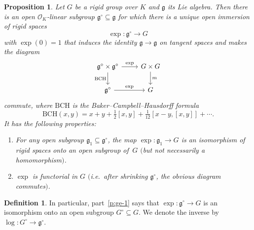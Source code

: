 \documentclass[11pt]{amsart}
\numberwithin{equation}{section}
\newtheorem{Proposition}[thm]{Proposition}
\theoremstyle{definition}
\newtheorem{Definition}[thm]{Definition}
\theoremstyle{remark}
\newcommand{\lra}{\longrightarrow}
\renewcommand{\O}{\mathcal{O}}
\newcommand{\mg}{\mathfrak{g}}
\begin{document}
\begin{Proposition}\label{p:general-exponential}
	Let $G$ be a rigid group over $K$ and $\mathfrak g$ its Lie algebra. Then there is an open $\O_K$-linear subgroup $\mathfrak g^{\circ}\subseteq \mathfrak g$ for which there is a unique open immersion of rigid spaces
	\[ \exp\colon\mathfrak g^{\circ}\lra G\]
	with $\exp(0)=1$ that induces the identity $\mathfrak g\to \mathfrak g$ on tangent spaces and makes the diagram
	\[\begin{tikzcd}
		\mathfrak g^{\circ}\times \mathfrak g^{\circ} \arrow[d, "\mathrm{BCH}"'] \arrow[r, "\exp"] & G\times G \arrow[d, "m"] \\
		\mathfrak g^{\circ} \arrow[r, "\exp"] & G
	\end{tikzcd}\]
	commute,
	where $\mathrm{BCH}$ is the Baker--Campbell--Hausdorff formula \[\mathrm{BCH}(x,y)=x+y+\tfrac{1}{2}[x,y]+\tfrac{1}{12}[x-y,[x,y]]+\cdots.\]
        It has the following properties:
	\begin{enumerate}
		\item\label{p:ge-1} For any open subgroup $\mathfrak g_1\subseteq \mathfrak g^{\circ}$, the map $\exp\colon \mathfrak g_1\to G$ is an isomorphism of rigid spaces onto an open subgroup of\, $G$ $($but not necessarily a homomorphism$)$.
		\item\label{p:ge-2} 
	 $\exp$ is functorial in $G$ $($i.e.\ after shrinking $\mg^{\circ}$, the obvious diagram commutes$)$.
	\end{enumerate}
\end{Proposition}

\begin{Definition}
	In particular, part~\eqref{p:ge-1} says that $\exp\colon \mg^\circ\to G$ is an isomorphism onto an open subgroup $G^\circ\subseteq G$. We denote the inverse by $\log\colon G^\circ\to \mg^\circ$.
\end{Definition}
\end{document}
